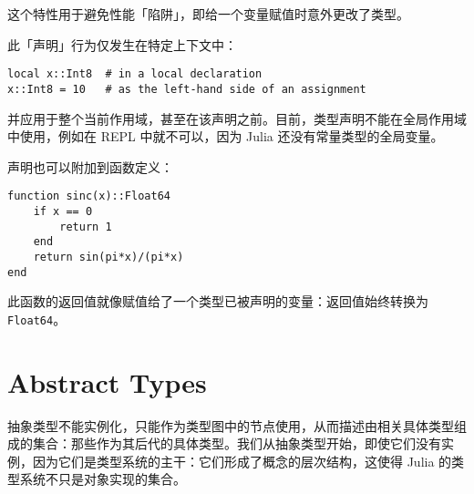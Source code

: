 这个特性用于避免性能「陷阱」，即给一个变量赋值时意外更改了类型。



此「声明」行为仅发生在特定上下文中：




\begin{verbatim}
local x::Int8  # in a local declaration
x::Int8 = 10   # as the left-hand side of an assignment
\end{verbatim}



并应用于整个当前作用域，甚至在该声明之前。目前，类型声明不能在全局作用域中使用，例如在 REPL 中就不可以，因为 Julia 还没有常量类型的全局变量。



声明也可以附加到函数定义：




\begin{verbatim}
function sinc(x)::Float64
    if x == 0
        return 1
    end
    return sin(pi*x)/(pi*x)
end
\end{verbatim}



此函数的返回值就像赋值给了一个类型已被声明的变量：返回值始终转换为\texttt{Float64}。



\hypertarget{5929227155379782502}{}


\section{Abstract Types}



抽象类型不能实例化，只能作为类型图中的节点使用，从而描述由相关具体类型组成的集合：那些作为其后代的具体类型。我们从抽象类型开始，即使它们没有实例，因为它们是类型系统的主干：它们形成了概念的层次结构，这使得 Julia 的类型系统不只是对象实现的集合。



